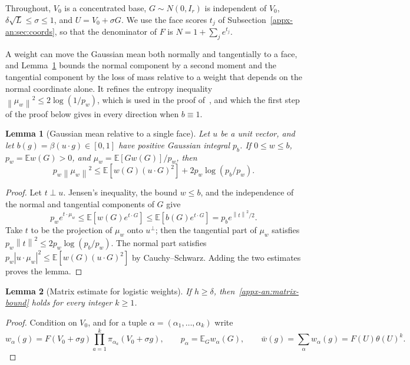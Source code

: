 \documentclass[11pt,letterpaper]{article}
\newif\ifshowrev
\newcommand{\rev}[1]{\ifshowrev{\color{revblue}%
\hypersetup{linkcolor=revblue,citecolor=revblue,urlcolor=revblue}#1}\else#1\fi}
\newenvironment{revblock}{\ifshowrev\color{revblue}%
\hypersetup{linkcolor=revblue,citecolor=revblue,urlcolor=revblue}\fi}{}
\newif\ifshowpass
\newcommand{\ps}[1]{\ifshowpass{\color{revblue}#1}\else#1\fi}
\newif\ifshowtrim
\newcommand{\trim}[1]{\ifshowtrim{\color{revblue}%
\hypersetup{linkcolor=revblue,citecolor=revblue,urlcolor=revblue}#1}\else#1\fi}
\newif\ifshownat
\newcommand{\nat}[1]{\ifshownat{\color{revblue}%
\hypersetup{linkcolor=revblue,citecolor=revblue,urlcolor=revblue}#1}\else#1\fi}
\newtheorem{lemma}{Lemma}
\theoremstyle{remark}
\newcommand{\E}{\mathbb E}
\newcommand{\norm}[1]{\left\lVert#1\right\rVert}
\begin{document}
\begin{revblock}
Throughout, \(V_0\) is a concentrated base, \(G\sim N(0,I_r)\) is
independent of \(V_0\), \(\delta\sqrt L\le\sigma\le1\), and
\(U=V_0+\sigma G\). \trim{We use the face scores \(t_j\) of
Subsection~\ref{appx-an:sec:coords}, so that the denominator of \(F\) is
\(N=1+\sum_je^{t_j}\).}

A weight can move the Gaussian mean both normally and tangentially to a
face, and Lemma~\ref{appx-an:lem:mean} bounds the normal component by a
second moment and the tangential component by the loss of mass relative
to a weight that depends on the normal coordinate alone. \rev{It refines
the entropy inequality \(\norm{\mu_w}^2\le2\log(1/p_w)\), which \nat{is used in the proof of~\cite[Lemma~12]{GaoZhang}}, and which the
first step of the proof below gives in every direction when
\(b\equiv1\).}

\begin{lemma}[Gaussian mean relative to a single face]
\label{appx-an:lem:mean}
Let \(u\) be a unit vector, and let \(b(g)=\beta(u\cdot g)\in[0,1]\) have
positive Gaussian integral \(p_b\). If \(0\le w\le b\),
\(p_w=\E w(G)>0\), and \(\mu_w=\E[Gw(G)]/p_w\), then
\begin{equation}
 p_w\norm{\mu_w}^2
 \le \E[w(G)(u\cdot G)^2]
        +2p_w\log(p_b/p_w).
 \label{appx-an:mean-entropy}
\end{equation}
\end{lemma}

\begin{proof}
Let \(t\perp u\). Jensen's inequality, the bound \(w\le b\), and the
independence of the normal and tangential components of \(G\) give
\[
 p_we^{t\cdot\mu_w}
 \le\E[w(G)e^{t\cdot G}]
 \le\E[b(G)e^{t\cdot G}]
 =p_be^{\norm{t}^2/2}.
\]
Take \(t\) to be the projection of \(\mu_w\) onto \(u^\perp\); then the
tangential part of \(\mu_w\) satisfies
\(p_w\norm t^2\le2p_w\log(p_b/p_w)\). The normal part satisfies
\(p_w|u\cdot\mu_w|^2\le\E[w(G)(u\cdot G)^2]\) by Cauchy--Schwarz. Adding
the two estimates proves the lemma.
\end{proof}

\begin{lemma}[Matrix estimate for logistic weights]
\label{appx-an:lem:matrix}
If \(h\ge\delta\), then~\eqref{appx-an:matrix-bound} holds for every
integer \(k\ge1\).
\end{lemma}

\begin{proof}
Condition on \(V_0\), and for a tuple \(\alpha=(\alpha_1,\ldots,\alpha_k)\)
write
\[
 w_\alpha(g)=F(V_0+\sigma g)
                  \prod_{a=1}^k\pi_{\alpha_a}(V_0+\sigma g),
 \qquad p_\alpha=\E_Gw_\alpha(G),
 \qquad \ps{\bar w}(g)=\sum_\alpha w_\alpha(g)=F(U)\theta(U)^k.
\]


\end{proof}
\end{revblock}
\end{document}
